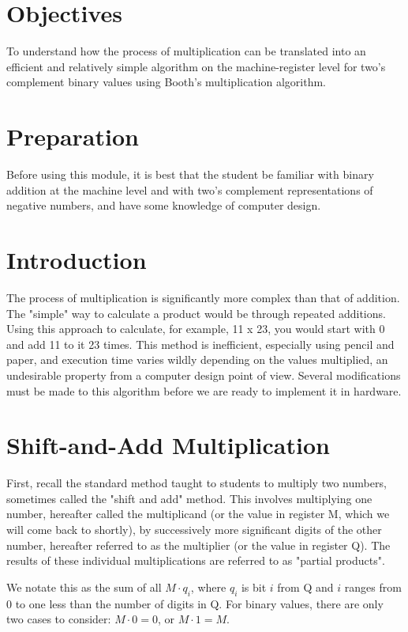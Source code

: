 \documentclass{article}
\begin{document}
\section{Objectives}
To understand how the process of multiplication can be translated into an efficient and relatively simple algorithm on the machine-register level for two's complement binary values using Booth's multiplication algorithm.

\section{Preparation}
Before using this module, it is best that the student be familiar with binary addition at the machine level and with two's complement representations of negative numbers, and have some knowledge of computer design.

\section{Introduction}
The process of multiplication is significantly more complex than that of addition.
The "simple" way to calculate a product would be through repeated additions.
Using this approach to calculate, for example, 11 x 23, you would start with 0 and add 11 to it 23 times.
This method is inefficient, especially using pencil and paper, and execution time varies wildly depending on the values multiplied, an undesirable property from a computer design point of view.
Several modifications must be made to this algorithm before we are ready to implement it in hardware.

\section{Shift-and-Add Multiplication}
First, recall the standard method taught to students to multiply two numbers, sometimes called the "shift and add" method.
This involves multiplying one number, hereafter called the multiplicand (or the value in register M, which we will come back to shortly), by successively more significant digits of the other number, hereafter referred to as the multiplier (or the value in register Q).
The results of these individual multiplications are referred to as "partial products".

We notate this as the sum of all $M \cdot q_i$, where $q_i$ is bit $i$ from Q and $i$ ranges from 0 to one less than the number of digits in Q.
For binary values, there are only two cases to consider: $M \cdot 0 = 0$, or $M \cdot 1 = M$.
\end{document}
